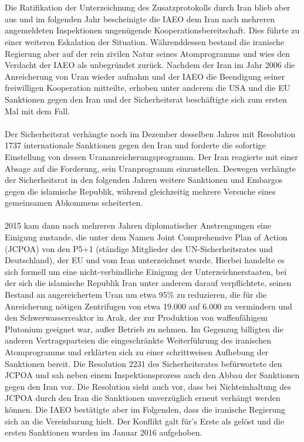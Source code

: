 \documentclass[a4paper,11pt]{article}
\begin{document}
\\ \\
Die Ratifikation der Unterzeichnung des Zusatzprotokolls durch Iran blieb aber aus und im folgenden Jahr bescheinigte die IAEO dem Iran nach mehreren angemeldeten Inspektionen ungenügende Kooperationsbereitschaft. Dies führte zu einer weiteren Eskalation der Situation. Währenddessen bestand die iranische Regierung aber auf der rein zivilen Natur seines Atomprogramms und wies den Verdacht der IAEO als unbegründet zurück. Nachdem der Iran im Jahr 2006 die Anreicherung von Uran wieder aufnahm und der IAEO die Beendigung seiner freiwilligen Kooperation mitteilte, erhoben unter anderem die USA und die EU Sanktionen gegen den Iran und der Sicherheitsrat beschäftigte sich zum ersten Mal mit dem Fall.
\\ \\
Der Sicherheitsrat verhängte noch im Dezember desselben Jahres mit Resolution 1737 internationale Sanktionen gegen den Iran und forderte die sofortige Einstellung von dessen Urananreicherungsprogramm. Der Iran reagierte mit einer Absage auf die Forderung, sein Uranprogramm einzustellen. Deswegen verhängte der Sicherheitsrat in den folgenden Jahren weitere Sanktionen und Embargos gegen die islamische Republik, während gleichzeitig mehrere Versuche eines gemeinsamen Abkommens scheiterten.
\\ \\
2015 kam dann nach mehreren Jahren diplomatischer Anstrengungen eine Einigung zustande, die unter dem Namen Joint Comprehensive Plan of Action (JCPOA) von den P5+1 (ständige Mitglieder des UN-Sicherheitsrates und Deutschland), der EU und vom Iran unterzeichnet wurde. Hierbei handelte es sich formell um eine nicht-verbindliche Einigung der Unterzeichnerstaaten, bei der sich die islamische Republik Iran unter anderem darauf verpflichtete, seinen Bestand an angereichertem Uran um etwa 95\% zu reduzieren, die für die Anreicherung nötigen Zentrifugen von etwa 19.000 auf 6.000 zu vermindern und den Schwerwasserreaktor in Arak, der zur Produktion von waffenfähigem Plutonium geeignet war, außer Betrieb zu nehmen. Im Gegenzug billigten die anderen Vertragsparteien die eingeschränkte Weiterführung des iranischen Atomprogramms und erklärten sich zu einer schrittweisen Aufhebung der Sanktionen bereit. Die Resolution 2231 des Sicherheitsrates befürwortete den JCPOA und sah neben einem Inspektionsprozess auch den Abbau der Sanktionen gegen den Iran vor. Die Resolution sieht auch vor, dass bei Nichteinhaltung des JCPOA durch den Iran die Sanktionen unverzüglich erneut verhängt werden können. Die IAEO bestätigte aber im Folgenden, dass die iranische Regierung sich an die Vereinbarung hielt. Der Konflikt galt für’s Erste als gelöst und die ersten Sanktionen wurden im Januar 2016 aufgehoben.
\end{document}
